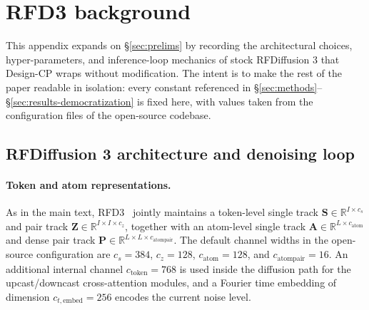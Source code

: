 \documentclass{article}
\theoremstyle{plain}
\theoremstyle{definition}
\theoremstyle{remark}
\begin{document}
\nocite{langley00}





\appendix
\onecolumn

\section{RFD3 background}
\label{app:rfd3-bg-parent}

This appendix expands on \S\ref{sec:prelims} by recording the architectural choices, hyper-parameters, and inference-loop mechanics of stock RFDiffusion 3 that Design-CP wraps without modification. The intent is to make the rest of the paper readable in isolation: every constant referenced in \S\ref{sec:methods}--\S\ref{sec:results-democratization} is fixed here, with values taken from the configuration files of the open-source codebase.

\subsection{RFDiffusion 3 architecture and denoising loop}
\label{app:rfd3-bg}

\paragraph{Token and atom representations.} As in the main text, RFD3~\cite{butcher_novo_2025} jointly maintains a token-level single track $\mathbf{S}\in\mathbb{R}^{I\times c_s}$ and pair track $\mathbf{Z}\in\mathbb{R}^{I\times I\times c_z}$, together with an atom-level single track $\mathbf{A}\in\mathbb{R}^{L\times c_\text{atom}}$ and dense pair track $\mathbf{P}\in\mathbb{R}^{L\times L\times c_\text{atompair}}$. The default channel widths in the open-source configuration are $c_s=384$, $c_z=128$, $c_\text{atom}=128$, and $c_\text{atompair}=16$. An additional internal channel $c_\text{token}=768$ is used inside the diffusion path for the upcast/downcast cross-attention modules, and a Fourier time embedding of dimension $c_{t,\text{embed}}=256$ encodes the current noise level.
\end{document}
